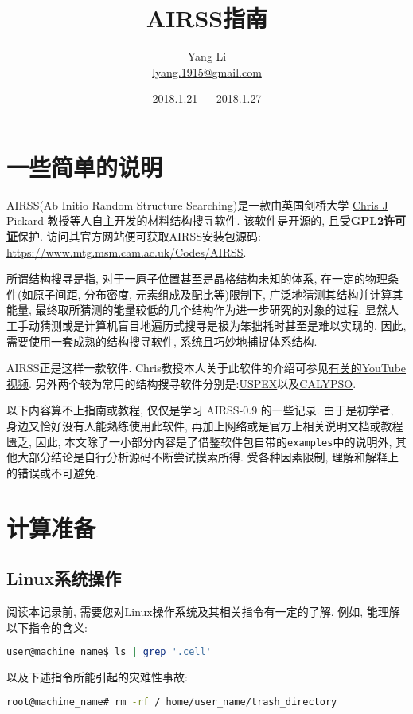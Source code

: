 \documentclass[a4paper, 10pt]{article}
\title{\textbf{AIRSS指南}}
\author{Yang Li\\ \href{mailto:lyang.1915@gmail.com}{lyang.1915@gmail.com}}
\date{2018.1.21 --- 2018.1.27}
\begin{document}
  \maketitle
  \tableofcontents
  
  \section{一些简单的说明}
    AIRSS(Ab Initio Random Structure Searching)是一款由英国剑桥大学 \href{https://www.mtg.msm.cam.ac.uk/People/CJP}{Chris J Pickard} 教授等人自主开发的材料结构搜寻软件. 该软件是开源的, 且受\href{https://en.wikipedia.org/wiki/GNU_General_Public_License}{\textbf{GPL2许可证}}保护. 访问其官方网站便可获取AIRSS安装包源码: \url{https://www.mtg.msm.cam.ac.uk/Codes/AIRSS}.
    
    所谓结构搜寻是指, 对于一原子位置甚至是晶格结构未知的体系, 在一定的物理条件(如原子间距, 分布密度, 元素组成及配比等)限制下, 广泛地猜测其结构并计算其能量, 最终取所猜测的能量较低的几个结构作为进一步研究的对象的过程. 显然人工手动猜测或是计算机盲目地遍历式搜寻是极为笨拙耗时甚至是难以实现的. 因此, 需要使用一套成熟的结构搜寻软件, 系统且巧妙地捕捉体系结构.
    
    AIRSS正是这样一款软件. Chris教授本人关于此软件的介绍可参见\href{https://www.youtube.com/watch?v=xW6pOYEIKVs&t=1061s}{有关的YouTube视频}. 另外两个较为常用的结构搜寻软件分别是:\href{http://uspex.stonybrook.edu/uspex.html}{USPEX}以及\href{http://www.calypso.cn}{CALYPSO}.

    以下内容算不上指南或教程, 仅仅是学习 AIRSS-0.9 的一些记录. 由于是初学者, 身边又恰好没有人能熟练使用此软件, 再加上网络或是官方上相关说明文档或教程匮乏, 因此, 本文除了一小部分内容是了借鉴软件包自带的\verb|examples|中的说明外, 其他大部分结论是自行分析源码不断尝试摸索所得. 受各种因素限制, 理解和解释上的错误或不可避免.
  \section{计算准备}
    \subsection{Linux系统操作} 
      阅读本记录前, 需要您对Linux操作系统及其相关指令有一定的了解. 例如, 能理解以下指令的含义:
      \begin{lstlisting}[language={bash}]
user@machine_name$ ls | grep '.cell'
      \end{lstlisting}
      以及下述指令所能引起的灾难性事故:
      \begin{lstlisting}[language={bash}]
root@machine_name# rm -rf / home/user_name/trash_directory
      \end{lstlisting}
    
\end{document}
